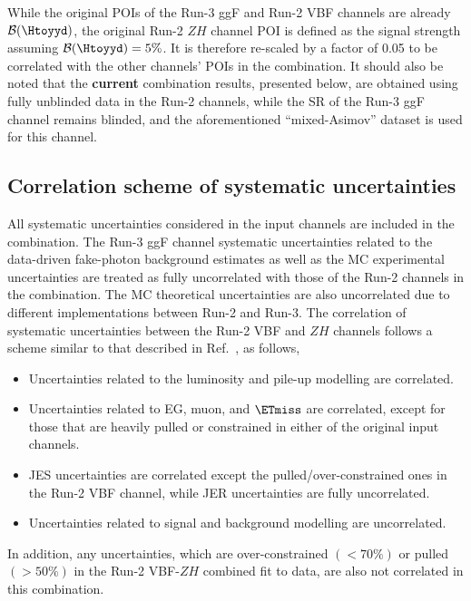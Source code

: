 While the original POIs of the Run-3 ggF and Run-2 VBF channels are already $\mathcal{B}(\Htoyyd)$, the original Run-2 $ZH$ channel POI is defined as the signal strength assuming $\mathcal{B}(\Htoyyd) = 5\%$.
It is therefore re-scaled by a factor of 0.05 to be correlated with the other channels' POIs in the combination.
It should also be noted that the \textbf{current} combination results, presented below, are obtained using fully unblinded data in the Run-2 channels, while the SR of the Run-3 ggF channel remains blinded, and the aforementioned ``mixed-Asimov'' dataset is used for this channel.

\subsection{Correlation scheme of systematic uncertainties}
\label{sec:correlation_scheme}
All systematic uncertainties considered in the input channels are included in the combination.
The Run-3 ggF channel systematic uncertainties related to the data-driven fake-photon background estimates as well as the MC experimental uncertainties are treated as fully uncorrelated with those of the Run-2 channels in the combination.
The MC theoretical uncertainties are also uncorrelated due to different implementations between Run-2 and Run-3.
The correlation of systematic uncertainties between the Run-2 VBF and $ZH$ channels follows a scheme similar to that described in Ref.~\cite{ATLAS:2024cju}, as follows,
\begin{itemize}
    \item Uncertainties related to the luminosity and pile-up modelling are correlated. 
    \item Uncertainties related to EG, muon, and $\ETmiss$ are correlated, except for those that are heavily pulled or constrained in either of the original input channels.
    \item JES uncertainties are correlated except the pulled/over-constrained ones in the Run-2 VBF channel, while JER uncertainties are fully uncorrelated.
    \item Uncertainties related to signal and background modelling are uncorrelated.
\end{itemize}
In addition, any uncertainties, which are over-constrained $(< 70\%)$ or pulled $(> 50\%)$ in the Run-2 VBF-$ZH$ combined fit to data, are also not correlated in this combination.

